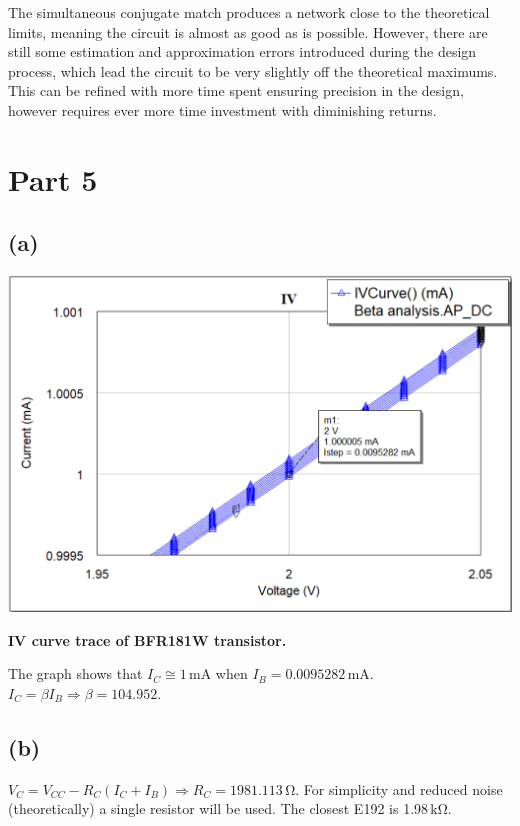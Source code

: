 \documentclass[12pt]{article}
\begin{document}
The simultaneous conjugate match produces a network close to the theoretical limits, 
meaning the circuit is almost as good as is possible. However, there are still some estimation and approximation errors
introduced during the design process, which lead the circuit to be very slightly off the theoretical maximums. 
This can be refined with more time spent ensuring precision in the design, however requires ever more time investment with diminishing returns.


\section*{Part 5}
\subsection*{(a)}


\begin{center}
    \includegraphics[width=\textwidth]{5 iv.png}

    \textbf{IV curve trace of BFR181W transistor.}
\end{center}
The graph shows that $ I_C \cong 1\,\unit{\milli\ampere} $ when $ I_B = 0.0095282\,\unit{\milli\ampere} $. $ I_C = \beta I_B \Rightarrow \beta = 104.952$.

\subsection*{(b)}

$ V_C = V_{CC} - R_C (I_C + I_B) \Rightarrow R_C = 1981.113\,\unit{\ohm}$. For simplicity and reduced noise (theoretically)
a single resistor will be used. The closest E192 is 1.98\,\unit{\kilo\ohm}.
\end{document}
